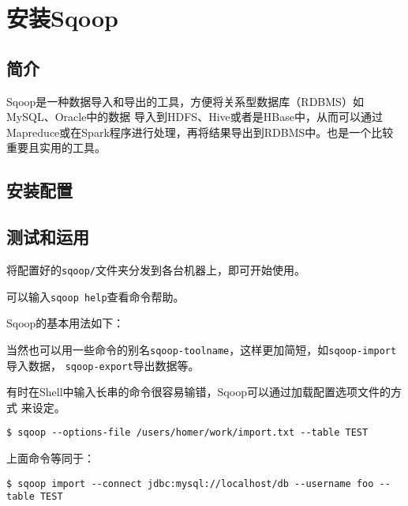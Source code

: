 \section{安装Sqoop}

\subsection{简介}
Sqoop是一种数据导入和导出的工具，方便将关系型数据库（RDBMS）如MySQL、Oracle中的数据
导入到HDFS、Hive或者是HBase中，从而可以通过Mapreduce或在Spark程序进行处理，再将结果导出到RDBMS中。也是一个比较重要且实用的工具。

\subsection{安装配置}



\subsection{测试和运用}

将配置好的\lstinline{sqoop/}文件夹分发到各台机器上，即可开始使用。

可以输入\lstinline{sqoop help}查看命令帮助。



Sqoop的基本用法如下：



当然也可以用一些命令的别名\lstinline{sqoop-toolname}，这样更加简短，如\lstinline{sqoop-import}导入数据，
\lstinline{sqoop-export}导出数据等。

有时在Shell中输入长串的命令很容易输错，Sqoop可以通过加载配置选项文件的方式
来设定。

\begin{lstlisting}[style=mysh]
$ sqoop --options-file /users/homer/work/import.txt --table TEST
\end{lstlisting}



上面命令等同于：

\begin{lstlisting}[style=mysh]
$ sqoop import --connect jdbc:mysql://localhost/db --username foo --table TEST
\end{lstlisting}

